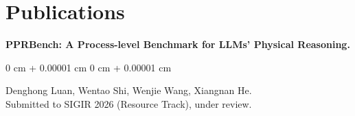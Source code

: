 \documentclass[10pt, letterpaper]{article}
\newenvironment{highlights}{
    \begin{itemize}[
        topsep=0.10 cm,
        parsep=0.10 cm,
        partopsep=0pt,
        itemsep=0pt,
        leftmargin=0 cm + 10pt
    ]
}{
    \end{itemize}
} %
\newenvironment{onecolentry}{
    \begin{adjustwidth}{
        0 cm + 0.00001 cm
    }{
        0 cm + 0.00001 cm
    }
}{
    \end{adjustwidth}
} %
\begin{document}




\section{Publications}


\textbf{PPRBench: A Process-level Benchmark for LLMs’ Physical Reasoning.}
        \vspace{0.10 cm}
        \begin{onecolentry}
        Denghong Luan, Wentao Shi, Wenjie Wang, Xiangnan He.\\
        Submitted to SIGIR 2026 (Resource Track), under review.
        \end{onecolentry}
\end{document}
